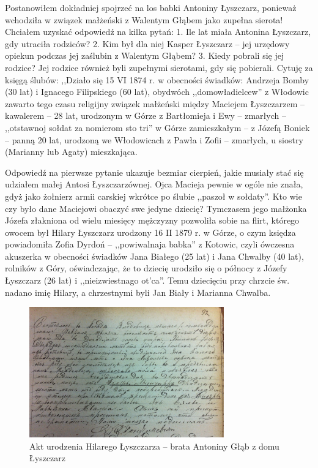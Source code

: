 Postanowiłem dokładniej spojrzeć na los babki Antoniny Łyszczarz, ponieważ wchodziła w związek małżeński z Walentym Głąbem jako zupełna sierota! Chciałem uzyskać odpowiedź na kilka pytań: 1. Ile lat miała Antonina Łyszczarz, gdy utraciła rodziców? 2. Kim był dla niej Kasper Łyszczarz – jej urzędowy opiekun podczas jej zaślubin z Walentym Głąbem? 3. Kiedy pobrali się jej rodzice? Jej rodzice również byli zupełnymi sierotami, gdy się pobierali. Cytuję za księgą ślubów: ,,Działo się 15 VI 1874 r. w obecności świadków: Andrzeja Bomby (30 lat) i Ignacego Filipskiego (60 lat), obydwóch ,,domowładielcew'' z Włodowic zawarto tego czasu religijny związek małżeński między Maciejem Łyszczarzem -- kawalerem -- 28 lat, urodzonym w Górze z Bartłomieja i Ewy -- zmarłych -- ,,otstawnoj sołdat za nomierom sto tri'' w Górze zamieszkałym – z Józefą Boniek – panną 20 lat, urodzoną we Włodowicach z Pawła i Zofii -- zmarłych, u siostry (Marianny lub Agaty) mieszkająca.

Odpowiedź na pierwsze pytanie ukazuje bezmiar cierpień, jakie musiały stać się udziałem małej Antosi Łyszczarzównej. Ojca Macieja pewnie w ogóle nie znała, gdyż jako żołnierz armii carskiej wkrótce po ślubie ,,paszoł w sołdaty''. Kto wie czy było dane Maciejowi obaczyć swe jedyne dziecię? Tymczasem jego małżonka Józefa złakniona od wielu miesięcy mężczyzny pozwoliła sobie na flirt, którego owocem był Hilary Łyszczarz urodzony 16 II 1879 r. w Górze, o czym księdza powiadomiła Zofia Dyrdoń -- ,,powiwalnaja babka'' z Kotowic, czyli ówczesna akuszerka w obecności świadków Jana Białego (25 lat) i Jana Chwalby (40 lat), rolników z Góry, oświadczając, że to dziecię urodziło się o północy z Józefy Łyszczarz (26 lat) i ,,nieizwiestnago ot'ca''. Temu dziecięciu przy chrzcie św. nadano imię Hilary, a chrzestnymi byli Jan Biały i Marianna Chwalba.


\begin{figure}[!h]
\begin{center}
\includegraphics[width=0.75\textwidth]{zdjecia/akt_urodzenia_hilarego_lyszczarza.jpg}
\caption[Akt urodzenia Hilarego Łyszczarza]{Akt urodzenia Hilarego Łyszczarza -- brata Antoniny Głąb z domu Łyszczarz}
\label{rys:akt_urodzenia_hilarego_lyszczarza}
\end{center}
\end{figure}

